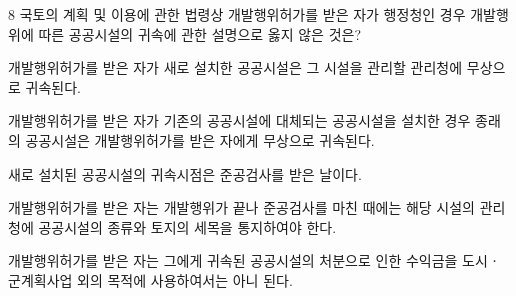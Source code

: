 \begin{question}{8}
국토의 계획 및 이용에 관한 법령상 개발행위허가를 받은 자가 행정청인 경우 개발행위에 따른 공공시설의 귀속에 관한 설명으로 옳지 않은 것은?
\begin{choices}
  \item 개발행위허가를 받은 자가 새로 설치한 공공시설은 그 시설을 관리할 관리청에 무상으로 귀속된다.
  \item 개발행위허가를 받은 자가 기존의 공공시설에 대체되는 공공시설을 설치한 경우 종래의 공공시설은 개발행위허가를 받은 자에게 무상으로 귀속된다.
  \item 새로 설치된 공공시설의 귀속시점은 준공검사를 받은 날이다.
  \item 개발행위허가를 받은 자는 개발행위가 끝나 준공검사를 마친 때에는 해당 시설의 관리청에 공공시설의 종류와 토지의 세목을 통지하여야 한다.
  \item 개발행위허가를 받은 자는 그에게 귀속된 공공시설의 처분으로 인한 수익금을 도시ㆍ군계획사업 외의 목적에 사용하여서는 아니 된다.
\end{choices}
\end{question}
